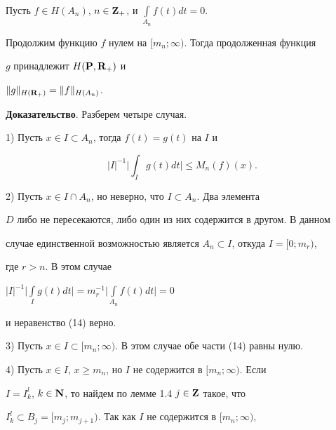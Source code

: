 \begin{lems}


Пусть $f\in H(A_n)$, $n\in\bold Z_+$, и $\int\limits_{A_n}f(t)dt=0$. 


Продолжим функцию $f$ нулем на $[m_n;\infty)$. Тогда продолженная функция 


$g$ принадлежит $H({\bold P},{\bold R}_+)$ и


$\|g\|_{H({\bold R}_+)}=\|f\|_{H(A_n)}$.


\end{lems}








{\bf Доказательство}. Разберем четыре случая.





1) Пусть $x\in I\subset A_n$, тогда $f(t)=g(t)$ на $I$ и


\begin{equation}


|I|^{-1}\bigg|\int_Ig(t)dt\bigg|\leq M_n(f)(x).


\end{equation}





2) Пусть $x\in I\cap A_n$, но неверно, что $I\subset A_n$. Два элемента 


$D$ либо не пересекаются, либо один из них содержится в другом. В данном 


случае единственной возможностью является $A_n\subset I$, откуда $I=[0;m_r)$, 


где $r>n$. В этом случае


$|I|^{-1}\Big|\int\limits_Ig(t)dt\Big|=


m_r^{-1}\Big|\int\limits_{A_n}f(t)dt\Big|=0$


и неравенство (14) верно.





3) Пусть $x\in I\subset [m_n;\infty)$. В этом случае обе части (14) равны нулю.





4) Пусть $x\in I$, $x\geq m_n$, но $I$ не содержится в $[m_n;\infty)$. Если 


$I=I^l_k$, $k\in\bold N$, то найдем по лемме 1.4 $j\in\bold Z$ такое, что


$I^l_k\subset B_j=[m_j;m_{j+1})$. Так как $I$ не содержится в $[m_n;\infty)$,


